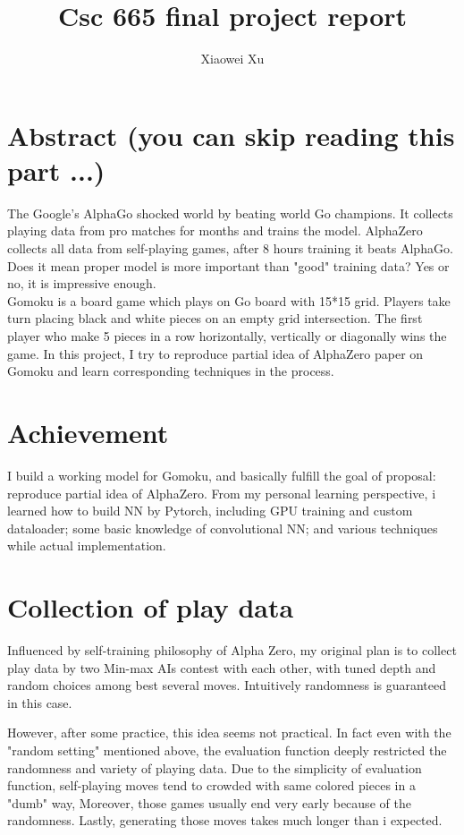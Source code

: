 \documentclass[11pt, twocolumn]{article}
\begin{document}
\title{Csc 665 final project report}
\author{Xiaowei Xu}

\maketitle

\section{Abstract (you can skip reading this part ...)}
The Google's AlphaGo shocked world by beating world Go champions. It collects playing data from pro matches for months and trains the model. AlphaZero collects all data from self-playing games, after 8 hours training it beats AlphaGo. Does it mean proper model is more important than "good" training data? Yes or no, it is impressive enough.\\
Gomoku is a board game which plays on Go board with 15*15 grid. Players take turn placing black and white pieces on an empty grid intersection. The first player who make 5 pieces in a row horizontally, vertically or diagonally wins the game. 
In this project, I try to reproduce partial idea of AlphaZero paper on Gomoku and learn corresponding techniques in the process.

\section{Achievement}
I build a working model for Gomoku, and basically fulfill the goal of proposal: reproduce partial idea of AlphaZero. From my personal learning perspective, i learned how to build NN by Pytorch, including GPU training and custom dataloader; some basic knowledge of convolutional NN; and various techniques while actual implementation.

\section{Collection of play data}
Influenced by self-training philosophy of Alpha Zero, my original plan is to collect play data by two Min-max AIs contest with each other, with tuned depth and random choices among best several moves. Intuitively randomness is guaranteed in this case.\newline

However, after some practice, this idea seems not practical. In fact even with the "random setting" mentioned above, the evaluation function deeply restricted the randomness and variety of playing data. Due to the simplicity of evaluation function, self-playing moves tend to crowded with same colored pieces in a "dumb" way, Moreover, those games usually end very early because of the randomness. Lastly, generating those moves takes much longer than i expected. \newline
\end{document}
